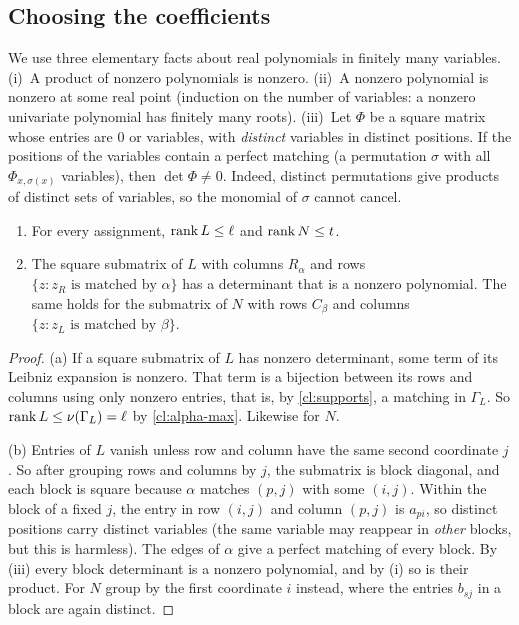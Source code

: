 \subsection{Choosing the coefficients}\label{sec:generic}

We use three elementary facts about real polynomials in finitely many
variables. (i)~A product of nonzero polynomials is nonzero. (ii)~A nonzero
polynomial is nonzero at some real point (induction on the number of
variables: a nonzero univariate polynomial has finitely many roots).
(iii)~Let $\Phi$ be a square matrix whose entries are $0$ or variables, with
\emph{distinct} variables in distinct positions. If the positions of the
variables contain a perfect matching (a permutation $\sigma$ with all
$\Phi_{x,\sigma(x)}$ variables), then $\det\Phi\ne0$. Indeed, distinct
permutations give products of distinct sets of variables, so the monomial of
$\sigma$ cannot cancel.

\begin{claim}\label{cl:edmonds}
\begin{enumerate}[label=(\alph*)]
\item For every assignment, $\operatorname{rank} L\le\ell$ and $\operatorname{rank} N\le t$.
\item The square submatrix of $L$ with columns $R_\alpha$ and rows
$\{z:z_R\text{ is matched by }\alpha\}$ has a determinant that is a nonzero
polynomial. The same holds for the submatrix of $N$ with rows $C_\beta$ and
columns $\{z: z_L\text{ is matched by }\beta\}$.
\end{enumerate}
\end{claim}

\begin{proof}
(a) If a square submatrix of $L$ has nonzero determinant, some term of its
Leibniz expansion is nonzero. That term is a bijection between its rows and
columns using only nonzero entries, that is, by \cref{cl:supports}, a
matching in $\Gamma_L$. So $\operatorname{rank} L\le\nu(\Gamma_L)=\ell$ by \cref{cl:alpha-max}.
Likewise for $N$.

(b) Entries of $L$ vanish unless row and column have the same second
coordinate $j$. So after grouping rows and columns by $j$, the submatrix is
block diagonal, and each block is square because $\alpha$ matches $(p,j)$ with
some $(i,j)$. Within the block of a fixed $j$, the entry in row $(i,j)$ and
column $(p,j)$ is $a_{pi}$, so distinct positions carry distinct variables
(the same variable may reappear in \emph{other} blocks, but this is
harmless). The edges of $\alpha$ give a perfect matching of every block. By
(iii) every block determinant is a nonzero polynomial, and by (i) so is
their product. For $N$ group by the first coordinate $i$ instead, where the
entries $b_{sj}$ in a block are again distinct.
\end{proof}

